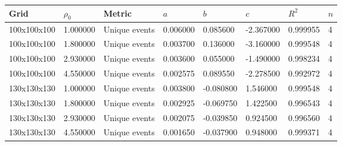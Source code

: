 \begin{tabular}{llllllll}
\toprule
Grid & $\rho_0$ & Metric & $a$ & $b$ & $c$ & $R^2$ & $n$ \\
\midrule
100x100x100 & 1.000000 & Unique events & 0.006000 & 0.085600 & -2.367000 & 0.999955 & 4 \\
100x100x100 & 1.800000 & Unique events & 0.003700 & 0.136000 & -3.160000 & 0.999548 & 4 \\
100x100x100 & 2.930000 & Unique events & 0.003600 & 0.055000 & -1.490000 & 0.998234 & 4 \\
100x100x100 & 4.550000 & Unique events & 0.002575 & 0.089550 & -2.278500 & 0.992972 & 4 \\
130x130x130 & 1.000000 & Unique events & 0.003800 & -0.080800 & 1.546000 & 0.999548 & 4 \\
130x130x130 & 1.800000 & Unique events & 0.002925 & -0.069750 & 1.422500 & 0.996543 & 4 \\
130x130x130 & 2.930000 & Unique events & 0.002075 & -0.039850 & 0.924500 & 0.996560 & 4 \\
130x130x130 & 4.550000 & Unique events & 0.001650 & -0.037900 & 0.948000 & 0.999371 & 4 \\
\bottomrule
\end{tabular}
